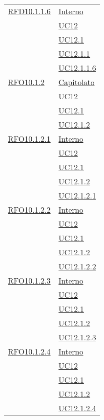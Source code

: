 \begin{longtable}{|>{\centering}m{5cm}|m{5cm}<{\centering}|}
 \hyperlink{RFD10.1.1.6}{RFD10.1.1.6} 
 & \hyperlink{Interno}{Interno}\\
& \hyperref[UC12]{UC12}\\
& \hyperref[UC12.1]{UC12.1}\\
& \hyperref[UC12.1.1]{UC12.1.1}\\
& \hyperref[UC12.1.1.6]{UC12.1.1.6}\\\hline

 \hyperlink{RFO10.1.2}{RFO10.1.2} 
  & \hyperlink{Capitolato}{Capitolato}\\
& \hyperref[UC12]{UC12}\\
& \hyperref[UC12.1]{UC12.1}\\
& \hyperref[UC12.1.2]{UC12.1.2}\\\hline

 \hyperlink{RFO10.1.2.1}{RFO10.1.2.1} 
 & \hyperlink{Interno}{Interno}\\
& \hyperref[UC12]{UC12}\\
& \hyperref[UC12.1]{UC12.1}\\
& \hyperref[UC12.1.2]{UC12.1.2}\\
& \hyperref[UC12.1.2.1]{UC12.1.2.1}\\\hline

 \hyperlink{RFO10.1.2.2}{RFO10.1.2.2} 
 & \hyperlink{Interno}{Interno}\\
& \hyperref[UC12]{UC12}\\
& \hyperref[UC12.1]{UC12.1}\\
& \hyperref[UC12.1.2]{UC12.1.2}\\
& \hyperref[UC12.1.2.2]{UC12.1.2.2}\\\hline

 \hyperlink{RFO10.1.2.3}{RFO10.1.2.3} & \hyperlink{Interno}{Interno}\\
& \hyperref[UC12]{UC12}\\
& \hyperref[UC12.1]{UC12.1}\\
& \hyperref[UC12.1.2]{UC12.1.2}\\
& \hyperref[UC12.1.2.3]{UC12.1.2.3}\\\hline

 \hyperlink{RFO10.1.2.4}{RFO10.1.2.4} 
 & \hyperlink{Interno}{Interno}\\
& \hyperref[UC12]{UC12}\\
& \hyperref[UC12.1]{UC12.1}\\
& \hyperref[UC12.1.2]{UC12.1.2}\\
& \hyperref[UC12.1.2.4]{UC12.1.2.4}\\\hline


\end{longtable}
